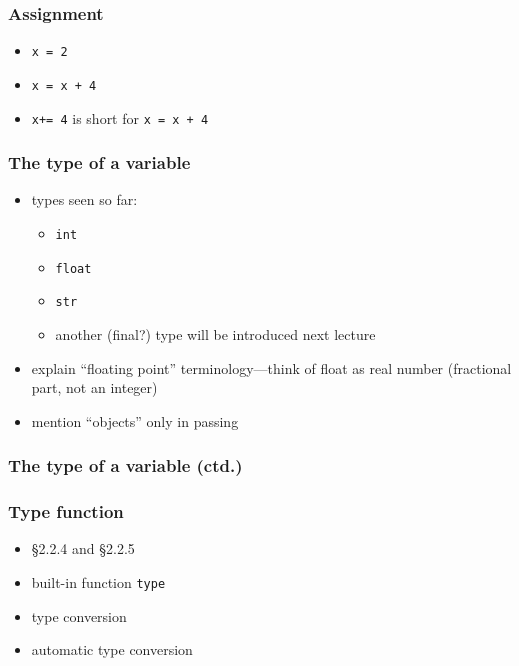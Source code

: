 \documentclass[14pt]{beamer}
\newcommand\red[1]{{\color{red} #1}}
\begin{document}

\begin{frame}[fragile]

\frametitle{Assignment}

\begin{itemize}
	\item \texttt{x = 2}
	\item \texttt{x = x + 4}
	\item \texttt{x+= 4} is short for \texttt{x = x + 4}
\end{itemize}

\end{frame}


\begin{frame}[fragile]

\frametitle{The type of a variable}

\begin{itemize}
	\item types seen so far:
	\begin{itemize}
		\item \texttt{int}
		\item \texttt{float}
		\item \texttt{str}
		\item another (final?) type will be introduced next lecture %
	\end{itemize}
	\item explain ``floating point'' terminology---think of float as real number (fractional part, not an integer)
	\item mention ``objects'' only in passing
\end{itemize}

\end{frame}


\begin{frame}[fragile]

\frametitle{The type of a variable (ctd.)}

\end{frame}


\begin{frame}[fragile]

\frametitle{Type function}

\begin{itemize}
	\item \red{\S2.2.4} and \red{\S2.2.5}
	\item built-in function \texttt{type}
	\item type conversion
	\item automatic type conversion
\end{itemize}

\end{frame}
\end{document}
